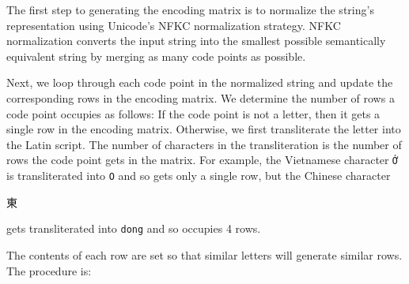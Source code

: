 \documentclass[sigconf,anonymous,review,10pt]{acmart}
\newcommand{\str}[1]{\texttt{#1}}
\begin{document}
\begin{description}
The first step to generating the encoding matrix is to normalize the string's representation using Unicode's NFKC normalization strategy.
NFKC normalization converts the input string into the smallest possible semantically equivalent string by merging as many code points as possible.

Next, we loop through each code point in the normalized string and update the corresponding rows in the encoding matrix.
We determine the number of rows a code point occupies as follows:
If the code point is not a letter, then it gets a single row in the encoding matrix.
Otherwise, we first transliterate the letter into the Latin script.
The number of characters in the transliteration is the number of rows the code point gets in the matrix.
For example, the Vietnamese character \str{\foreignlanguage{vietnamese}{Ớ}} is transliterated into \str{O} and so gets only a single row,
but the Chinese character \begin{CJK}{UTF8}{min}東\end{CJK} gets transliterated into \str{dong} and so occupies 4 rows.

The contents of each row are set so that similar letters will generate similar rows.
The procedure is:


\end{description}
\end{document}
